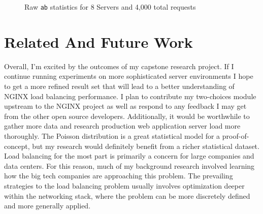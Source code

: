 \begin{figure}
\centering
{}
\caption{Raw \texttt{ab} statistics for 8 Servers and 4,000 total requests}
\label{fig:ab-stats}
\end{figure}

\section{Related And Future Work}
Overall, I'm excited by the outcomes of my capstone research project.
If I continue running experiments on more sophisticated server
environments I hope to get a more refined result set that will lead to
a better understanding of NGINX load balancing performance. I plan to
contribute my two-choices module upstream to the NGINX project as well
as respond to any feedback I may get from the other open source
developers. Additionally, it would be worthwhile to gather more data
and research production web application server load more thoroughly.
The Poisson distribution is a great statistical model for a
proof-of-concept, but my research would definitely benefit from a
richer statistical dataset. Load balancing for the most part is
primarily a concern for large companies and data centers. For this
reason, much of my background research involved learning how the big
tech companies are approaching this problem. The prevailing strategies
to the load balancing problem usually involves optimization deeper
within the networking stack, where the problem can be more discretely
defined and more generally applied.

